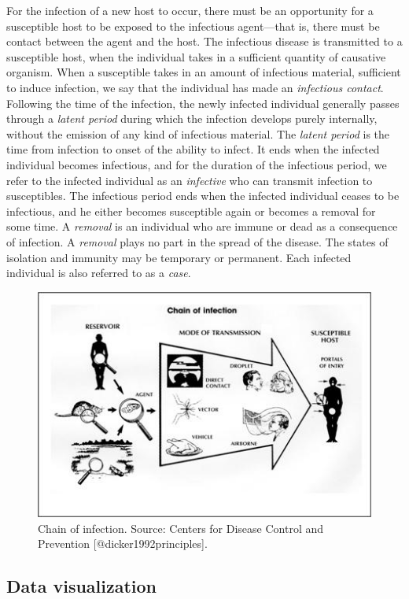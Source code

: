 \documentclass[]{book}
\begin{document}
For the infection of a new host to occur, there must be an opportunity
for a susceptible host to be exposed to the infectious agent---that is,
there must be contact between the agent and the host. The infectious
disease is transmitted to a susceptible host, when the individual takes
in a sufficient quantity of causative organism. When a susceptible takes
in an amount of infectious material, sufficient to induce infection, we
say that the individual has made an \emph{infectious contact}. Following
the time of the infection, the newly infected individual generally
passes through a \emph{latent period} during which the infection
develops purely internally, without the emission of any kind of
infectious material. The \emph{latent period} is the time from infection
to onset of the ability to infect. It ends when the infected individual
becomes infectious, and for the duration of the infectious period, we
refer to the infected individual as an \emph{infective} who can transmit
infection to susceptibles. The infectious period ends when the infected
individual ceases to be infectious, and he either becomes susceptible
again or becomes a removal for some time. A \emph{removal} is an
individual who are immune or dead as a consequence of infection. A
\emph{removal} plays no part in the spread of the disease. The states of
isolation and immunity may be temporary or permanent. Each infected
individual is also referred to as a \emph{case}.

\begin{figure}

{\centering \includegraphics[width=0.5\linewidth]{figures/infection} 

}

\caption{Chain of infection. Source: Centers for Disease Control and Prevention [@dicker1992principles].}\label{fig:infection}
\end{figure}

\subsection{Data visualization}\label{data-visualization}
\end{document}
